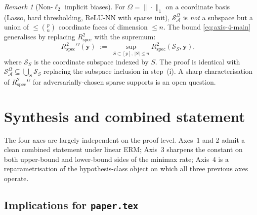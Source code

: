 \documentclass[11pt,a4paper]{article}
\theoremstyle{plain}
\theoremstyle{definition}
\theoremstyle{remark}
\newtheorem{remark}[theorem]{Remark}
\newcommand{\by}{\mathbf{y}}
\newcommand{\Rspec}{R^2_{\mathrm{spec}}}
\newcommand{\Scal}{\mathcal{S}}
\newcommand{\Acal}{\mathcal{A}}
\begin{document}
\begin{remark}[Non-$\ell_2$ implicit biases]
\label{rem:lasso}
For $\Omega = \|\cdot\|_1$ on a coordinate basis (Lasso, hard
thresholding, ReLU-NN with sparse init), $\Scal_\Acal^\Omega$ is
\emph{not} a subspace but a union of $\le \binom{p}{n}$ coordinate
faces of dimension $\le n$. The bound \eqref{eq:axis-4-main}
generalises by replacing $\Rspec$ with the supremum:
\begin{equation*}
    \Rspec^{\Omega}(\by)
    \;:=\; \sup_{S \subset [p],\, |S| \le n} \Rspec(\Scal_S, \by),
\end{equation*}
where $\Scal_S$ is the coordinate subspace indexed by $S$. The
proof is identical with $\Scal_\Acal^\Omega \subseteq \bigcup_S
\Scal_S$ replacing the subspace inclusion in step~(i). A sharp
characterisation of $\Rspec^\Omega$ for adversarially-chosen sparse
supports is an open question.
\end{remark}

\section{Synthesis and combined statement}
\label{sec:synthesis}

The four axes are largely independent on the proof level.
Axes~1 and 2 admit a clean combined statement under linear ERM;
Axis~3 sharpens the constant on both upper-bound and lower-bound
sides of the minimax rate; Axis~4 is a reparametrisation of the
hypothesis-class object on which all three previous axes operate.

\subsection{Implications for \texttt{paper.tex}}
\label{sec:paper-implication}
\end{document}
